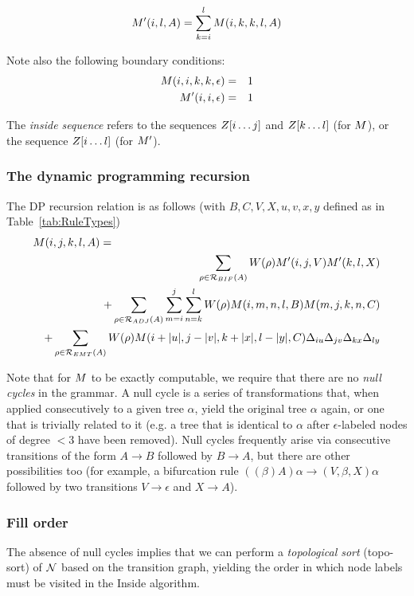 \documentclass[10pt]{article}
\newcommand{\tabnum}[1]{\ref{tab:#1}}
\newcommand{\tabref}[1]{Table~\tabnum{#1}}
\begin{document}
\[
M'(i,l,A) = \sum_{k=i}^l M(i,k,k,l,A)
\]

Note also the following boundary conditions:
\begin{eqnarray*}
M(i,i,k,k,\epsilon) & = & 1 \\
M'(i,i,\epsilon) & = & 1
\end{eqnarray*}

The {\em inside sequence} refers to the sequences $Z[i \ldots j]$ and $Z[k \ldots l]$ (for $M$),
or the sequence $Z[i \ldots l]$ (for $M'$).

\subsubsection{The dynamic programming recursion}

The DP recursion relation is as follows (with $B,C,V,X,u,v,x,y$ defined as in \tabref{RuleTypes})
\begin{eqnarray*}
\lefteqn{\m(i,j,k,l,A) =} \\
& &
\sum_{\rho \in \rulesubset{BIF}{A}} W(\rho) \mtip(i,j,V) \mtip(k,l,X) \\
& & +
\sum_{\rho \in \rulesubset{ADJ}{A}} \sum_{m=i}^j \sum_{n=k}^l W(\rho) \m(i,m,n,l,B) \m(m,j,k,n,C) \\
& & +
\sum_{\rho \in \rulesubset{EMT}{A}} W(\rho) \m(i+|u|,j-|v|,k+|x|,l-|y|,C) \iumatch \jvmatch \kxmatch \lymatch
\end{eqnarray*}

Note that for $M$ to be exactly computable, we require that there are no {\em null cycles} in the grammar.
A null cycle is a series of transformations that, when applied consecutively to a given tree $\alpha$, yield the original tree $\alpha$ again,
or one that is trivially related to it (e.g. a tree that is identical to $\alpha$ after $\epsilon$-labeled nodes of degree $<3$ have been removed).
Null cycles frequently arise via consecutive transitions of the form $A \to B$ followed by $B \to A$,
but there are other possibilities too (for example, a bifurcation rule $((\beta)A)\alpha \to (V,\beta,X)\alpha$
followed by two transitions $V \to \epsilon$ and $X \to A$).

\subsubsection{Fill order}

The absence of null cycles implies that we can perform a {\em topological sort} (topo-sort) of ${\cal N}$ based on the transition graph,
yielding the order in which node labels must be visited in the Inside algorithm.
\end{document}
